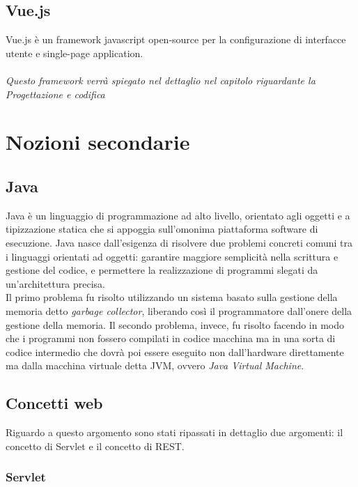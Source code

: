 \subsection{Vue.js}

Vue.js è un framework javascript open-source per la configurazione di interfacce utente e single-page application.\\
\\
\textit{Questo framework verrà spiegato nel dettaglio nel capitolo riguardante la Progettazione e codifica}

\section{Nozioni secondarie}

\subsection{Java}

Java è un linguaggio di programmazione ad alto livello, orientato agli oggetti e a tipizzazione statica che si appoggia sull'omonima piattaforma software di esecuzione. Java nasce dall'esigenza di risolvere due problemi concreti comuni tra i linguaggi orientati ad oggetti: garantire maggiore semplicità nella scrittura e gestione del codice, e permettere la realizzazione di programmi slegati da un'architettura precisa.\\
Il primo problema fu risolto utilizzando un sistema basato sulla gestione della memoria detto \textit{garbage collector}, liberando così il programmatore dall'onere della gestione della memoria. Il secondo problema, invece, fu risolto facendo in modo che i programmi non fossero compilati in codice macchina ma in una sorta di codice intermedio che dovrà poi essere eseguito non dall'hardware direttamente ma dalla macchina virtuale detta JVM, ovvero \textit{Java Virtual Machine}.\\

\subsection{Concetti web}

Riguardo a questo argomento sono stati ripassati in dettaglio due argomenti: il concetto di Servlet e il concetto di REST.

\subsubsection{Servlet}

